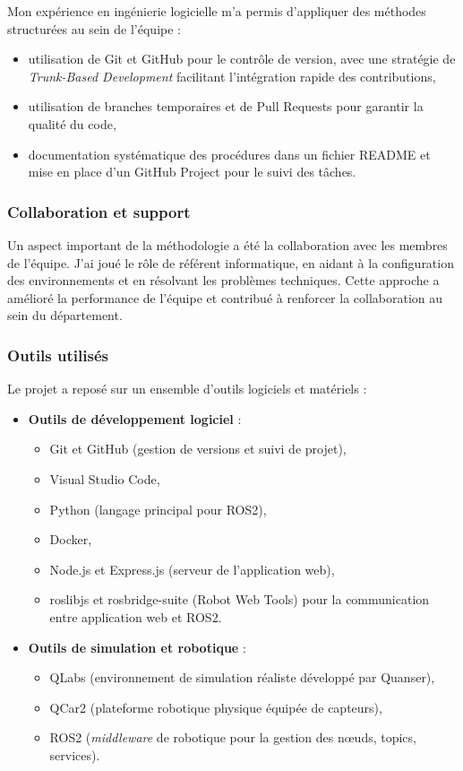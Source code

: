 \documentclass{name}
\begin{document}
Mon expérience en ingénierie logicielle m'a permis d'appliquer des méthodes structurées au sein de l'équipe :

\begin{itemize}
    \item utilisation de Git et GitHub pour le contrôle de version, avec une stratégie de \textit{Trunk-Based Development} facilitant l'intégration rapide des contributions,
    \item utilisation de branches temporaires et de Pull Requests pour garantir la qualité du code,
    \item documentation systématique des procédures dans un fichier README et mise en place d'un GitHub Project pour le suivi des tâches.
\end{itemize}

\subsubsection{Collaboration et support}

Un aspect important de la méthodologie a été la collaboration avec les membres de l'équipe. J'ai joué le rôle de référent informatique, en aidant à la configuration des environnements et en résolvant les problèmes techniques. Cette approche a amélioré la performance de l'équipe et contribué à renforcer la collaboration au sein du département.

\subsubsection{Outils utilisés}

Le projet a reposé sur un ensemble d'outils logiciels et matériels :

\begin{itemize}
    \item \textbf{Outils de développement logiciel} :
    \begin{itemize}
        \item Git et GitHub (gestion de versions et suivi de projet),
        \item Visual Studio Code,
        \item Python (langage principal pour ROS2),
        \item Docker,
        \item Node.js et Express.js (serveur de l'application web),
        \item roslibjs et rosbridge-suite (Robot Web Tools) pour la communication entre application web et ROS2.
    \end{itemize}
    
    \item \textbf{Outils de simulation et robotique} :
    \begin{itemize}
        \item QLabs (environnement de simulation réaliste développé par Quanser),
        \item QCar2 (plateforme robotique physique équipée de capteurs),
        \item ROS2 (\textit{middleware} de robotique pour la gestion des nœuds, topics, services).
    \end{itemize}
\end{itemize}
\end{document}
